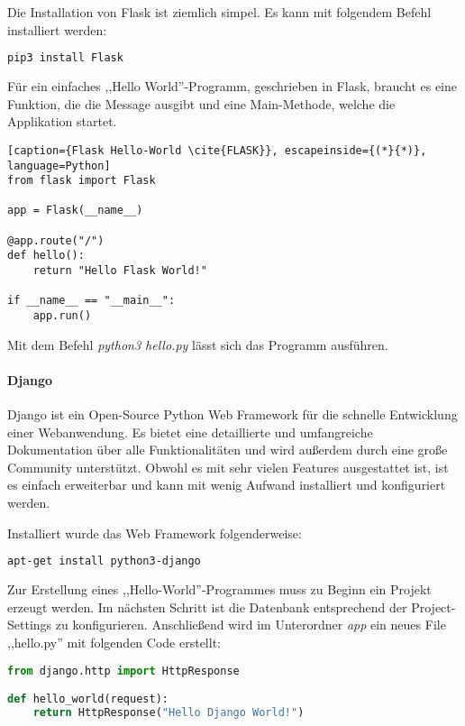 Die Installation von Flask ist ziemlich simpel. Es kann mit folgendem Befehl installiert werden:
\begin{lstlisting}[caption={Installation von Flask \cite{FLASK}}, language=bash]
pip3 install Flask
\end{lstlisting}

Für ein einfaches ,,Hello World''-Programm, geschrieben in Flask, braucht es eine Funktion, die die Message ausgibt und eine Main-Methode, welche die Applikation startet.

\begin{lstlisting}[caption={Flask Hello-World \cite{FLASK}}, escapeinside={(*}{*)}, language=Python]
from flask import Flask

app = Flask(__name__)

@app.route("/")
def hello():
	return "Hello Flask World!"

if __name__ == "__main__":
    app.run()
\end{lstlisting}

Mit dem Befehl \textit{python3 hello.py} lässt sich das Programm ausführen.

\paragraph{Django}
Django ist ein Open-Source Python Web Framework für die schnelle Entwicklung einer Webanwendung. Es bietet eine detaillierte und umfangreiche Dokumentation über alle Funktionalitäten und wird außerdem durch eine große Community unterstützt. Obwohl es mit sehr vielen Features ausgestattet ist, ist es einfach erweiterbar und kann mit wenig Aufwand installiert und konfiguriert werden.\cite{DJANGO}

Installiert wurde das Web Framework folgenderweise:
\begin{lstlisting}[caption={Installation von Django\cite{DJANGOIN}}, language=bash]
apt-get install python3-django
\end{lstlisting}

Zur Erstellung eines ,,Hello-World''-Programmes muss zu Beginn ein Projekt erzeugt werden. Im nächsten Schritt ist die Datenbank entsprechend der Project-Settings zu konfigurieren. Anschließend wird im Unterordner \textit{app} ein neues File ,,hello.py'' mit folgenden Code erstellt:

\begin{lstlisting}[caption={Django Hello-World \cite{DJANGOCODE}}, language=Python]
from django.http import HttpResponse

def hello_world(request):
	return HttpResponse("Hello Django World!")
\end{lstlisting}

